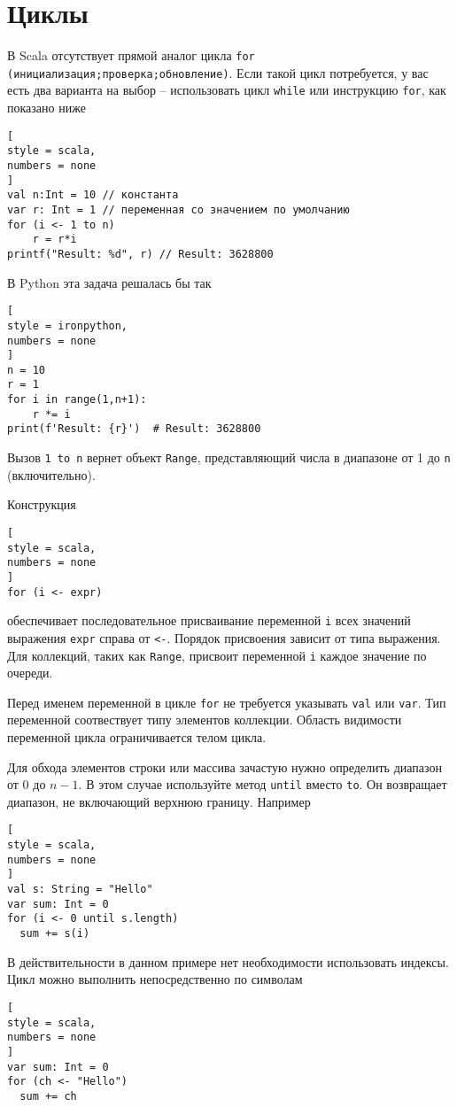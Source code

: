 \documentclass[%
	11pt,
	a4paper,
	utf8,
		]{article}
\begin{document}
\section{Циклы}

В Scala отсутствует прямой аналог цикла \texttt{for (инициализация;проверка;обновление)}. Если такой цикл потребуется, у вас есть два варианта на выбор -- использовать цикл \texttt{while} или инструкцию \texttt{for}, как показано ниже
\begin{lstlisting}[
style = scala,
numbers = none
]
val n:Int = 10 // константа
var r: Int = 1 // переменная со значением по умолчанию
for (i <- 1 to n)
    r = r*i
printf("Result: %d", r) // Result: 3628800
\end{lstlisting}

В Python эта задача решалась бы так
\begin{lstlisting}[
style = ironpython,
numbers = none
]
n = 10
r = 1
for i in range(1,n+1):
    r *= i
print(f'Result: {r}')  # Result: 3628800
\end{lstlisting}

Вызов \texttt{1 to n} вернет объект \texttt{Range}, представляющий числа в диапазоне от 1 до \texttt{n} (включительно).

Конструкция
\begin{lstlisting}[
style = scala,
numbers = none
]
for (i <- expr)
\end{lstlisting}
обеспечивает последовательное присваивание переменной \texttt{i} всех значений выражения \texttt{expr} справа от \texttt{<-}. Порядок присвоения зависит от типа выражения. Для коллекций, таких как \texttt{Range}, присвоит переменной \texttt{i} каждое значение по очереди.

Перед именем переменной в цикле \texttt{for} не требуется указывать \texttt{val} или \texttt{var}. Тип переменной соотвествует типу элементов коллекции. Область видимости переменной цикла ограничивается телом цикла.

Для обхода элементов строки или массива зачастую нужно определить диапазон от 0 до $ n - 1 $. В этом случае используйте метод \texttt{until} вместо \texttt{to}. Он возвращает диапазон, не включающий верхнюю границу. Например
\begin{lstlisting}[
style = scala,
numbers = none
]
val s: String = "Hello"
var sum: Int = 0
for (i <- 0 until s.length)
  sum += s(i)
\end{lstlisting}

В действительности в данном примере нет необходимости использовать индексы. Цикл можно выполнить непосредственно по символам
\begin{lstlisting}[
style = scala,
numbers = none
]
var sum: Int = 0
for (ch <- "Hello")
  sum += ch
\end{lstlisting}
\end{document}
